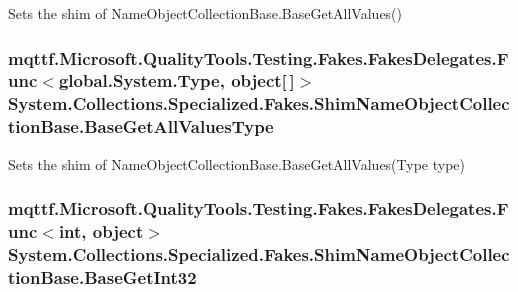 Sets the shim of Name\-Object\-Collection\-Base.\-Base\-Get\-All\-Values()

\hypertarget{class_system_1_1_collections_1_1_specialized_1_1_fakes_1_1_shim_name_object_collection_base_a23c31c5c64207a89877656394e9b030a}{
\subsubsection[{Base\-Get\-All\-Values\-Type}]{\setlength{\rightskip}{0pt plus 5cm}mqttf.\-Microsoft.\-Quality\-Tools.\-Testing.\-Fakes.\-Fakes\-Delegates.\-Func$<$global.\-System.\-Type, object\mbox{[}$\,$\mbox{]}$>$ System.\-Collections.\-Specialized.\-Fakes.\-Shim\-Name\-Object\-Collection\-Base.\-Base\-Get\-All\-Values\-Type\hspace{0.3cm}{\ttfamily [set]}}}\label{class_system_1_1_collections_1_1_specialized_1_1_fakes_1_1_shim_name_object_collection_base_a23c31c5c64207a89877656394e9b030a}


Sets the shim of Name\-Object\-Collection\-Base.\-Base\-Get\-All\-Values(\-Type type)

\hypertarget{class_system_1_1_collections_1_1_specialized_1_1_fakes_1_1_shim_name_object_collection_base_affcd125b73d79e081105c93ba4b58bb4}{
\subsubsection[{Base\-Get\-Int32}]{\setlength{\rightskip}{0pt plus 5cm}mqttf.\-Microsoft.\-Quality\-Tools.\-Testing.\-Fakes.\-Fakes\-Delegates.\-Func$<$int, object$>$ System.\-Collections.\-Specialized.\-Fakes.\-Shim\-Name\-Object\-Collection\-Base.\-Base\-Get\-Int32\hspace{0.3cm}{\ttfamily [set]}}}\label{class_system_1_1_collections_1_1_specialized_1_1_fakes_1_1_shim_name_object_collection_base_affcd125b73d79e081105c93ba4b58bb4}


